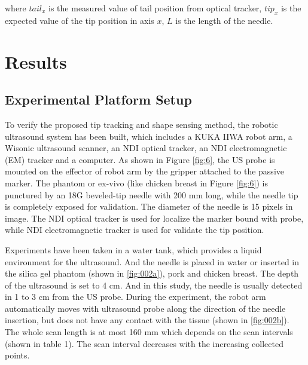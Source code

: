 \documentclass[journal,article,submit,moreauthors,pdftex]{Definitions/mdpi}
\begin{document}
where ${{tail}_x}$ is the measured value of tail position from optical tracker, ${{tip}_x}$ is the expected value of the tip position in axis ${x}$, ${L}$ is the length of the needle.

\section{Results}
\subsection{Experimental Platform Setup}
To verify the proposed tip tracking and shape sensing method, the robotic ultrasound system has been built, which includes a KUKA IIWA robot arm, a Wisonic ultrasound scanner, an NDI optical tracker, an NDI electromagnetic (EM) tracker and a computer. As shown in Figure \ref{fig:6}, the US probe is mounted on the effector of robot arm by the gripper attached to the passive marker. The phantom or ex-vivo (like chicken breast in Figure \ref{fig:6}) is punctured by an 18G beveled-tip needle with 200 mm long, while the needle tip is completely exposed for validation.
The diameter of the needle is 15 pixels in image.
The NDI optical tracker is used for localize the marker bound with probe, while NDI electromagnetic tracker is used for validate the tip position.

Experiments have been taken in a water tank, which provides a liquid environment for the ultrasound.
And the needle is placed in water or inserted in the silica gel phantom (shown in \ref{fig:002a}), pork and chicken breast.
The depth of the ultrasound is set to 4 cm.
And in this study, the needle is usually detected in 1 to 3 cm from the US probe.
During the experiment, the robot arm automatically moves with ultrasound probe along the direction of the needle insertion, but does not have any contact with the tissue (shown in \ref{fig:002b}).
The whole scan length is at most 160 mm which depends on the scan intervals (shown in table 1). The scan interval decreases with the increasing collected points.
\end{document}
